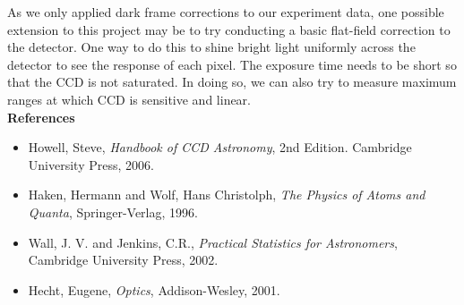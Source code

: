 \documentclass[authoryear,12pt,5p,times]{elsarticle}
\begin{document}
As we only applied dark frame corrections to our experiment data, one possible extension to this project may be to try conducting a basic flat-field correction to the detector. One way to do this to shine bright light uniformly across the detector to see the response of each pixel. The exposure time needs to be short so that the CCD is not saturated. In doing so, we can also try to measure maximum ranges at which CCD is sensitive and linear.
\\
\vspace{10pt}
\textbf{References}
\vspace{-10pt}
%
\begin{itemize}
\item Howell, Steve,  \textit{Handbook of CCD Astronomy}, 2nd Edition. Cambridge University Press, 2006.
\item Haken, Hermann and Wolf, Hans Christolph, \textit{The Physics of Atoms and Quanta}, Springer-Verlag, 1996.
\item Wall, J. V. and Jenkins, C.R., \textit{Practical Statistics for Astronomers}, Cambridge University Press, 2002.
\item Hecht, Eugene, \textit{Optics}, Addison-Wesley, 2001.
\end{itemize}
\vspace{-10pt}
\end{document}
